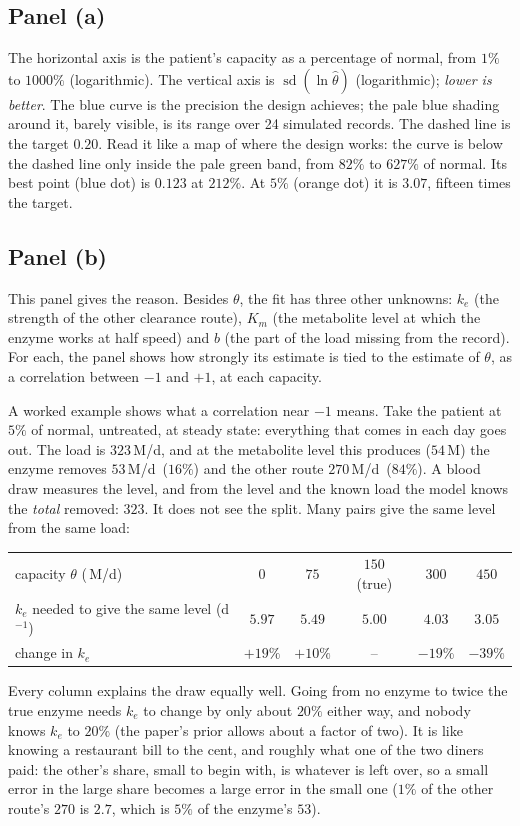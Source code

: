 \documentclass[11pt,a4paper]{article}
\newcommand{\um}{\,\textmu M/d}
\newcommand{\sdl}[1]{\operatorname{sd}(\ln #1)}
\begin{document}
\subsection{Panel (a)} The horizontal axis is the patient's capacity as a percentage of normal,
from $1\%$ to $1000\%$ (logarithmic). The vertical axis is $\sdl{\hat\theta}$ (logarithmic);
\emph{lower is better}. The blue curve is the precision the design achieves; the pale blue
shading around it, barely visible, is its range over 24 simulated records. The dashed line is
the target $0.20$. Read it like a map of where the design works: the curve is below the dashed
line only inside the pale green band, from $82\%$ to $627\%$ of normal. Its best point (blue
dot) is $0.123$ at $212\%$. At $5\%$ (orange dot) it is $3.07$, fifteen times the target.

\subsection{Panel (b)} This panel gives the reason. Besides $\theta$, the fit has three other
unknowns: $k_e$ (the strength of the other clearance route), $K_m$ (the metabolite level at
which the enzyme works at half speed) and $b$ (the part of the load missing from the record).
For each, the panel shows how strongly its estimate is tied to the estimate of $\theta$, as a
correlation between $-1$ and $+1$, at each capacity.

A worked example shows what a correlation near $-1$ means. Take the patient at $5\%$ of normal,
untreated, at steady state: everything that comes in each day goes out. The load is $323$\um, and
at the metabolite level this produces ($54$\,\textmu M) the enzyme removes $53$\um\ ($16\%$) and
the other route $270$\um\ ($84\%$). A blood draw measures the level, and from the level and the
known load the model knows the \emph{total} removed: $323$. It does not see the split. Many
pairs give the same level from the same load:
\begin{center}\small
\begin{tabular}{@{}lccccc@{}}
\toprule
capacity $\theta$ (\um) & $0$ & $75$ & $150$ (true) & $300$ & $450$ \\
$k_e$ needed to give the same level (d$^{-1}$) & $5.97$ & $5.49$ & $5.00$ & $4.03$ & $3.05$ \\
change in $k_e$ & $+19\%$ & $+10\%$ & -- & $-19\%$ & $-39\%$ \\
\bottomrule
\end{tabular}
\end{center}
Every column explains the draw equally well. Going from no enzyme to twice the true enzyme needs
$k_e$ to change by only about $20\%$ either way, and nobody knows $k_e$ to $20\%$ (the paper's
prior allows about a factor of two). It is like knowing a restaurant bill to the cent, and
roughly what one of the two diners paid: the other's share, small to begin with, is whatever is
left over, so a small error in the large share becomes a large error in the small one ($1\%$ of
the other route's $270$ is $2.7$, which is $5\%$ of the enzyme's $53$).
\end{document}
